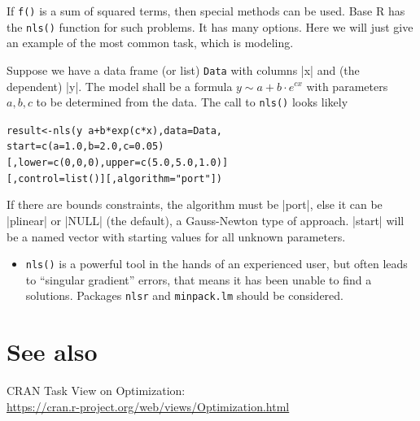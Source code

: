 \documentclass[9pt,a4paper,onecolumn,oneside]{extarticle}
\begin{document}
\begin{landscape}
\begin{multicols}{2}
If \texttt{f()} is a sum of squared terms, then special methods can be
used. Base R has the \texttt{nls()} function for such problems. It has
many options. Here we will just give an example of the most common task,
which is modeling.

Suppose we have a data frame (or list) \texttt{Data} with columns |x| and
(the dependent) |y|. The model shall be a formula
\( y \sim a + b \cdot e^{c x} \)
with parameters \( a, b, c \) to be determined from the data. The call to 
\texttt{nls()} looks likely

\begin{alltt}
 result <- nls(y ~ a + b*exp(c*x), data = Data,
               start = c(a=1.0, b=2.0, c=0.05)
               [, lower = c(0,0,0), upper = c(5.0,5.0,1.0)]
               [, control = list()] [, algorithm = "port"])
\end{alltt}

If there are bounds constraints, the algorithm must be |port|, else it 
can be |plinear| or |NULL| (the default), a Gauss-Newton type of approach.
|start| will be a named vector with starting values for all unknown 
parameters.

\begin{itemize}
\item
  \texttt{nls()} is a powerful tool in the hands of an experienced user,
  but often leads to ``singular gradient'' errors, that means it has been 
  unable to find a solutions. Packages \texttt{nlsr} and \texttt{minpack.lm} 
  should be considered.
\end{itemize}


\section*{\color{darkred} See also}\label{See also}

CRAN Task View on Optimization: \\
\hspace*{9mm}\url{https://cran.r-project.org/web/views/Optimization.html} 


\end{multicols}

\end{landscape}
\end{document}
